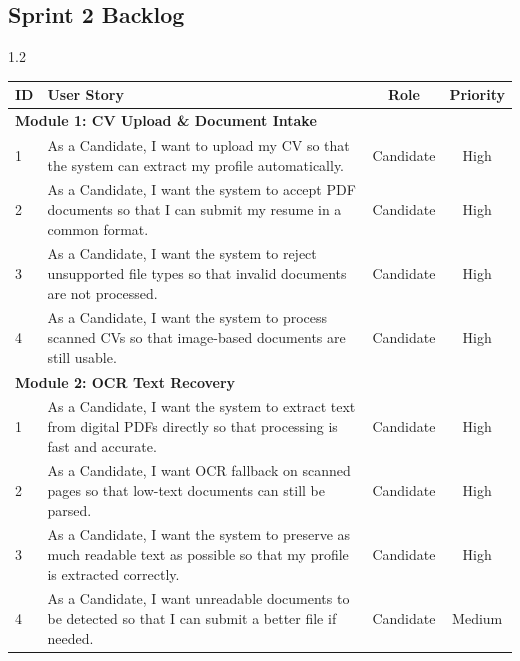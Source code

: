 \subsection{Sprint 2 Backlog}
\label{sec:sprint2:backlog}

\begin{spacing}{1.2}
\begin{center}
\label{tab:sprint2_backlog}
\begin{tabularx}{\textwidth}{|l|X|c|c|}
\hline
\rowcolor{gray!20} \textbf{ID} & \textbf{User Story} & \textbf{Role} & \textbf{Priority} \\ \hline

\multicolumn{4}{|l|}{\cellcolor{gray!10}\textbf{Module 1: CV Upload \& Document Intake}} \\ \hline
1 & As a Candidate, I want to upload my CV so that the system can extract my profile automatically. & Candidate & High \\ \hline
2 & As a Candidate, I want the system to accept PDF documents so that I can submit my resume in a common format. & Candidate & High \\ \hline
3 & As a Candidate, I want the system to reject unsupported file types so that invalid documents are not processed. & Candidate & High \\ \hline
4 & As a Candidate, I want the system to process scanned CVs so that image-based documents are still usable. & Candidate & High \\ \hline

\multicolumn{4}{|l|}{\cellcolor{gray!10}\textbf{Module 2: OCR Text Recovery}} \\ \hline
1 & As a Candidate, I want the system to extract text from digital PDFs directly so that processing is fast and accurate. & Candidate & High \\ \hline
2 & As a Candidate, I want OCR fallback on scanned pages so that low-text documents can still be parsed. & Candidate & High \\ \hline
3 & As a Candidate, I want the system to preserve as much readable text as possible so that my profile is extracted correctly. & Candidate & High \\ \hline
4 & As a Candidate, I want unreadable documents to be detected so that I can submit a better file if needed. & Candidate & Medium \\ \hline


\end{tabularx}
\end{center}
\end{spacing}
